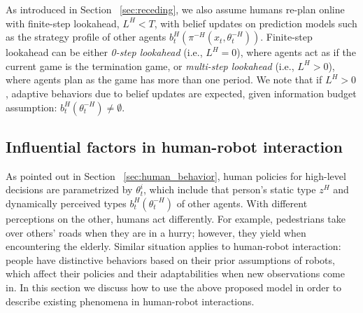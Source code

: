 \documentclass[letterpaper, 10 pt, conference]{ieeeconf}  %
\begin{document}
As introduced in Section ~\ref{sec:receding}, we also assume humans re-plan 
online with finite-step lookahead, $L^H<T$, with belief updates on prediction 
models such as the strategy profile of other agents 
$b^H_t(\pi^{-H}(x_t,\theta^{-H}_t))$. Finite-step lookahead can be either 
\textit{0-step lookahead} (i.e., $L^H=0$), where agents act as if the current 
game is the termination game, or \textit{multi-step lookahead} (i.e., $L^H>0$), 
where agents plan as the game has more than one period. We note that if $L^H>0$, 
adaptive behaviors due to belief updates are expected, given information 
budget assumption: $b^H_t(\theta^{-H}_t)\neq \emptyset$.




\subsection{Influential factors in human-robot interaction}
As pointed out in Section ~\ref{sec:human_behavior}, human policies for high-level decisions are parametrized by $\theta^i_t$, which include that person's static type $z^H$ and dynamically perceived types $b^H_t(\theta^{-H}_t)$ of other agents. With different perceptions on the other, humans act differently. For example, pedestrians take over others' roads when they are in a hurry; however, they yield when encountering the elderly. Similar situation 
applies to human-robot interaction: people have distinctive behaviors based on their prior assumptions of robots, which affect their policies and their adaptabilities when new observations come in. In this section we discuss how to use the above proposed model in order to describe	 existing phenomena in human-robot interactions. 
\end{document}
